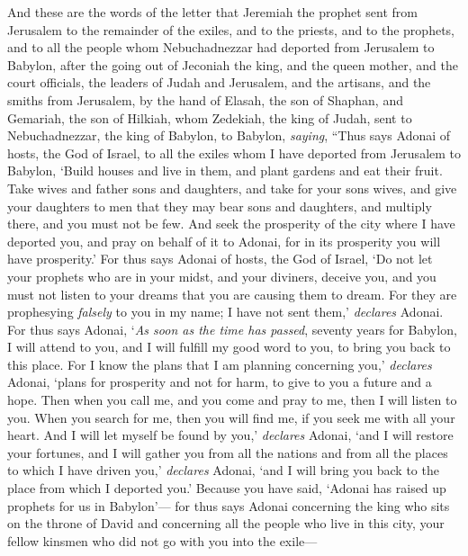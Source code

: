 \begin{biblechapter} %
 And these are the words of the letter that Jeremiah the prophet sent from Jerusalem to the remainder of the exiles, and to the priests, and to the prophets, and to all the people whom Nebuchadnezzar had deported from Jerusalem to Babylon,
\verse after the going out of Jeconiah the king, and the queen mother, and the court officials, the leaders of Judah and Jerusalem, and the artisans, and the smiths from Jerusalem,
\verse by the hand of Elasah, the son of Shaphan, and Gemariah, the son of Hilkiah, whom Zedekiah, the king of Judah, sent to Nebuchadnezzar, the king of Babylon, to Babylon, \textit{saying},
\verse “Thus says Adonai of hosts, the God of Israel, to all the exiles whom I have deported from Jerusalem to Babylon,
\verse ‘Build houses and live in them, and plant gardens and eat their fruit.
\verse Take wives and father sons and daughters, and take for your sons wives, and give your daughters to men that they may bear sons and daughters, and multiply there, and you must not be few.
\verse And seek the prosperity of the city where I have deported you, and pray on behalf of it to Adonai, for in its prosperity you will have prosperity.’
\verse For thus says Adonai of hosts, the God of Israel, ‘Do not let your prophets who are in your midst, and your diviners, deceive you, and you must not listen to your dreams that you are causing them to dream.
\verse For they are prophesying \textit{falsely} to you in my name; I have not sent them,’ \textit{declares} Adonai.
\verse For thus says Adonai, ‘\textit{As soon as the time has passed}, seventy years for Babylon, I will attend to you, and I will fulfill my good word to you, to bring you back to this place.
\verse For I know the plans that I am planning concerning you,’ \textit{declares} Adonai, ‘plans for prosperity and not for harm, to give to you a future and a hope.
\verse Then when you call me, and you come and pray to me, then I will listen to you.
\verse When you search for me, then you will find me, if you seek me with all your heart.
\verse And I will let myself be found by you,’ \textit{declares} Adonai, ‘and I will restore your fortunes, and I will gather you from all the nations and from all the places to which I have driven you,’ \textit{declares} Adonai, ‘and I will bring you back to the place from which I deported you.’
\verse Because you have said, ‘Adonai has raised up prophets for us in Babylon’—
\verse for thus says Adonai concerning the king who sits on the throne of David and concerning all the people who live in this city, your fellow kinsmen who did not go with you into the exile—

\end{biblechapter}
